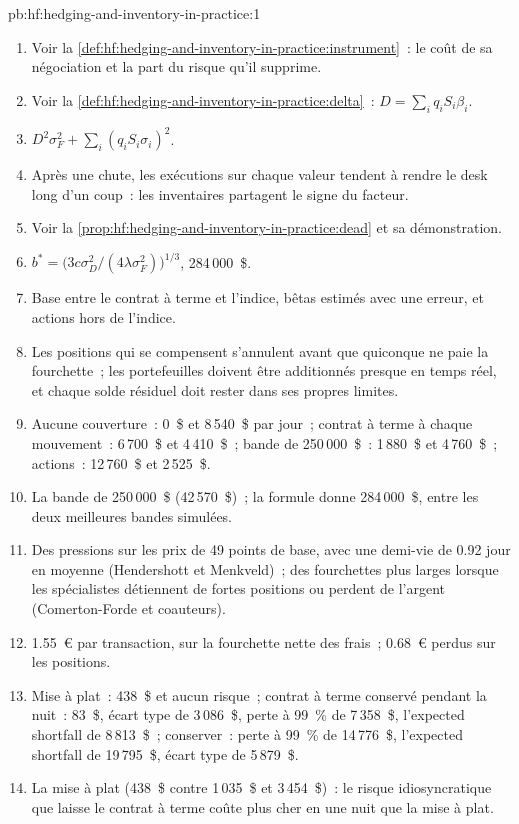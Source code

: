 \begin{solution}{pb:hf:hedging-and-inventory-in-practice:1}
\begin{enumerate}
\item Voir la \cref{def:hf:hedging-and-inventory-in-practice:instrument}~: le coût de sa négociation et la part du risque qu'il supprime.
\item Voir la \cref{def:hf:hedging-and-inventory-in-practice:delta}~: $D=\sum_iq_iS_i\beta_i$.
\item $D^2\sigma_F^2+\sum_i(q_iS_i\sigma_i)^2$.
\item Après une chute, les exécutions sur chaque valeur tendent à rendre le desk long d'un coup~: les inventaires partagent le signe du facteur.
\item Voir la \cref{prop:hf:hedging-and-inventory-in-practice:dead} et sa démonstration.
\item $b^\ast=\bigl(3c\sigma_D^2/(4\lambda\sigma_F^2)\bigr)^{1/3}$, 284\,000~\$.
\item Base entre le contrat à terme et l'indice, bêtas estimés avec une erreur, et actions hors de l'indice.
\item Les positions qui se compensent s'annulent avant que quiconque ne paie la fourchette~; les portefeuilles doivent être additionnés presque en temps réel, et chaque solde résiduel doit rester dans ses propres
limites.
\item Aucune couverture~: 0~\$ et 8\,540~\$ par jour~; contrat à terme à chaque mouvement~: 6\,700~\$ et 4\,410~\$~; bande de 250\,000~\$~: 1\,880~\$ et 4\,760~\$~; actions~: 12\,760~\$ et 2\,525~\$.
\item La bande de 250\,000~\$ (42\,570~\$)~; la formule donne 284\,000~\$, entre les deux meilleures bandes simulées.
\item Des pressions sur les prix de 49 points de base, avec une demi-vie de 0.92 jour en moyenne (Hendershott et Menkveld)~; des fourchettes plus larges lorsque les spécialistes détiennent
de fortes positions ou perdent de l'argent (Comerton-Forde et coauteurs).
\item 1.55~\euro{} par transaction, sur la fourchette nette des frais~; 0.68~\euro{} perdus sur les positions.
\item Mise à plat~: 438~\$ et aucun risque~; contrat à terme conservé pendant la nuit~: 83~\$, écart type de 3\,086~\$, perte à 99~\% de 7\,358~\$, l'expected shortfall de 8\,813~\$~; conserver~: perte à 99~\%
de 14\,776~\$, l'expected shortfall de 19\,795~\$, écart type de 5\,879~\$.
\item La mise à plat (438~\$ contre 1\,035~\$ et 3\,454~\$)~: le risque idiosyncratique que laisse le contrat à terme coûte plus cher en une nuit que la mise à plat.

\end{enumerate}
\end{solution}
